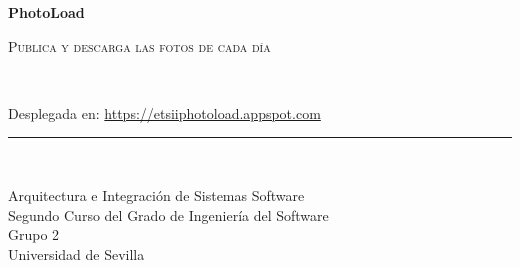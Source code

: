 \documentclass{scrartcl}
\begin{document}
\begin{titlepage}
\begin{center}
	\vspace*{-1in}
	\vspace*{2in}
	\begin{Huge}
		\textbf{PhotoLoad} \\
	\end{Huge}
	\vspace*{0.15in}	
	\begin{LARGE}
		\textsc{Publica y descarga las fotos de cada día}
	\end{LARGE}\\
	\vspace*{0.2in}	
	\begin{figure}[H]
		\centering
		\label{fig:logo}
	\end{figure}Desplegada en: \href{https://etsiiphotoload.appspot.com}{https://etsiiphotoload.appspot.com}\\
	\vspace*{0.1in}
	\rule{140mm}{0.1mm}\\
	\vspace*{0.1in}
	\begin{Large}
	Arquitectura e Integración de Sistemas Software\\	
	Segundo Curso del Grado de Ingeniería del Software\\
	Grupo 2\\
	Universidad de Sevilla\\	


\end{Large}
\end{center}
\end{titlepage}
\end{document}
